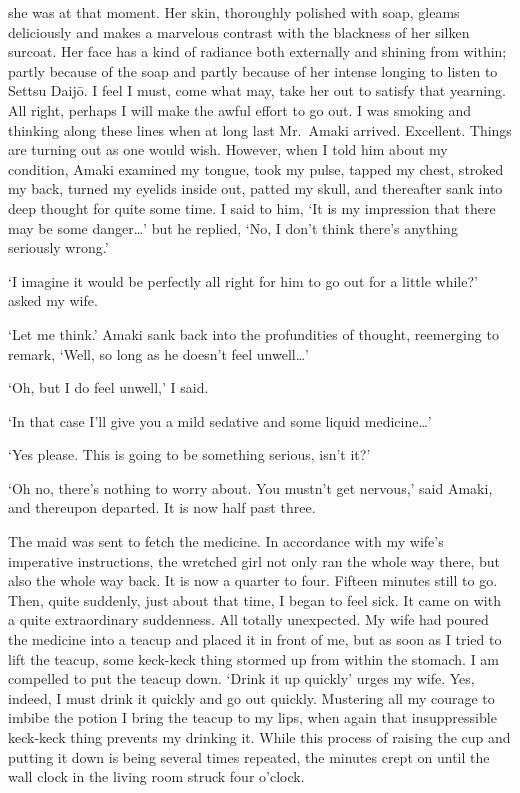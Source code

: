 \documentclass{book}
\begin{document}
she was at that moment. Her skin, thoroughly polished with soap, gleams
deliciously and makes a marvelous contrast with the blackness of her
silken surcoat. Her face has a kind of radiance both externally and
shining from within; partly because of the soap and partly because of
her intense longing to listen to Settsu Daijō. I feel I must, come what
may, take her out to satisfy that yearning. All right, perhaps I will
make the awful effort to go out. I was smoking and thinking along these
lines when at long last Mr.~Amaki arrived. Excellent. Things are turning
out as one would wish. However, when I told him about my condition,
Amaki examined my tongue, took my pulse, tapped my chest, stroked my
back, turned my eyelids inside out, patted my skull, and thereafter sank
into deep thought for quite some time. I said to him, `It is my
impression that there may be some danger\ldots{}' but he replied, `No, I
don't think there's anything seriously wrong.'

`I imagine it would be perfectly all right for him to go out for a
little while?' asked my wife.

`Let me think.' Amaki sank back into the profundities of thought,
reemerging to remark, `Well, so long as he doesn't feel unwell\ldots{}'

`Oh, but I do feel unwell,' I said.

`In that case I'll give you a mild sedative and some liquid
medicine\ldots{}'

`Yes please. This is going to be something serious, isn't it?'

`Oh no, there's nothing to worry about. You mustn't get nervous,' said
Amaki, and thereupon departed. It is now half past three.

The maid was sent to fetch the medicine. In accordance with my wife's
imperative instructions, the wretched girl not only ran the whole way
there, but also the whole way back. It is now a quarter to four. Fifteen
minutes still to go. Then, quite suddenly, just about that time, I began
to feel sick. It came on with a quite extraordinary suddenness. All
totally unexpected. My wife had poured the medicine into a teacup and
placed it in front of me, but as soon as I tried to lift the teacup,
some keck-keck thing stormed up from within the stomach. I am compelled
to put the teacup down. `Drink it up quickly' urges my wife. Yes,
indeed, I must drink it quickly and go out quickly. Mustering all my
courage to imbibe the potion I bring the teacup to my lips, when again
that insuppressible keck-keck thing prevents my drinking it. While this
process of raising the cup and putting it down is being several times
repeated, the minutes crept on until the wall clock in the living room
struck four o'clock.
\end{document}
